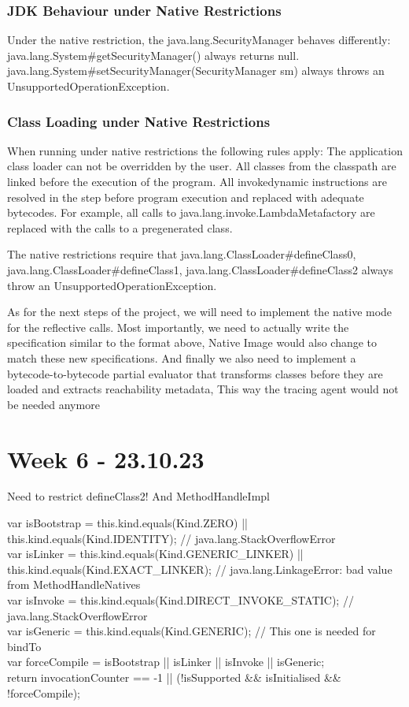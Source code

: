\subsubsection{JDK Behaviour under Native Restrictions}
Under the native restriction, the java.lang.SecurityManager behaves differently:
java.lang.System\#getSecurityManager() always returns null. 
java.lang.System\#setSecurityManager(SecurityManager sm) always throws an UnsupportedOperationException. 


\subsubsection{Class Loading under Native Restrictions}
When running under native restrictions the following rules apply:
The application class loader can not be overridden by the user.
All classes from the classpath are linked before the execution of the program.
All invokedynamic instructions are resolved in the step before program execution and replaced with adequate bytecodes. For example, all calls to java.lang.invoke.LambdaMetafactory are replaced with the calls to a pregenerated class.

The native restrictions require that java.lang.ClassLoader\#defineClass0, java.lang.ClassLoader\#defineClass1, java.lang.ClassLoader\#defineClass2 always throw an UnsupportedOperationException. 


As for the next steps of the project, we will need to implement the native mode for the reflective calls.
Most importantly, we need to actually write the specification similar to the format above, Native Image would also change to match these new specifications.
And finally we also need to implement a bytecode-to-bytecode partial evaluator that transforms classes before they are loaded and extracts reachability metadata, This way the tracing agent would not be needed anymore

\section{Week 6 - 23.10.23}

Need to restrict defineClass2!
And MethodHandleImpl

var isBootstrap = this.kind.equals(Kind.ZERO) || this.kind.equals(Kind.IDENTITY); // java.lang.StackOverflowError \\
var isLinker = this.kind.equals(Kind.GENERIC\_LINKER) || this.kind.equals(Kind.EXACT\_LINKER);  // java.lang.LinkageError: bad value from MethodHandleNatives \\
var isInvoke = this.kind.equals(Kind.DIRECT\_INVOKE\_STATIC); // java.lang.StackOverflowError \\
var isGeneric = this.kind.equals(Kind.GENERIC); // This one is needed for bindTo \\
var forceCompile = isBootstrap || isLinker || isInvoke || isGeneric; \\
return invocationCounter == -1 || (!isSupported \&\& isInitialised \&\& !forceCompile);


